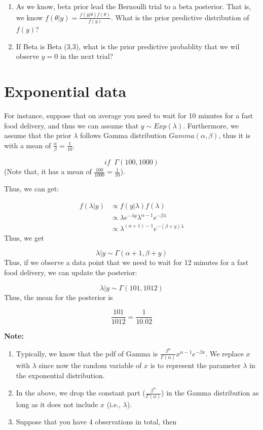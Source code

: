 \documentclass[
]{book}
\begin{document}
\begin{enumerate}
\def\labelenumi{(\arabic{enumi})}
\item
  As we know, beta prior lead the Bernoulli trial to a beta posterior. That is, we know \(f(\theta|y)=\frac{f(y|\theta) f(\theta)}{f(y)}\). What is the prior predictive distribution of \(f(y)\)?
\item
  If Beta is Beta (3,3), what is the prior predictive probablity that we wil observe \(y=0\) in the next trial?
\end{enumerate}

\hypertarget{exponential-data}{%
\section{Exponential data}\label{exponential-data}}

For instance, suppose that on average you need to wait for 10 minutes for a fast food delivery, and thus we can assume that \(y \sim Exp(\lambda)\). Furthermore, we assume that the prior \(\lambda\) follows Gamma distribution \(Gamma(\alpha, \beta)\), thus it is with a mean of \(\frac{\alpha}{\beta}=\frac{1}{10}\).

\[if \; \; \Gamma (100, 1000)\]
(Note that, it has a mean of \(\frac{100}{1000}=\frac{1}{10}\)).

Thus, we can get:

\[\begin{aligned} f(\lambda | y) &\propto f(y|\lambda) f(\lambda) \\ &\propto \lambda e^{-\lambda y} \lambda^{\alpha-1}e^{-\beta \lambda} \\ &\propto \lambda^{(\alpha+1)-1} e^{-(\beta+y)\lambda } \end{aligned}\]
Thus, we get

\[\lambda |y \sim \Gamma (\alpha+1,\beta+y)\]
Thus, if we observe a data point that we need to wait for 12 minutes for a fast food delivery, we can update the posterior:

\[\lambda |y \sim \Gamma (101,1012)\]
Thus, the mean for the posterior is

\[\frac{101}{1012}=\frac{1}{10.02}\]

\textbf{Note:}

\begin{enumerate}
\def\labelenumi{(\arabic{enumi})}
\item
  Typically, we know that the pdf of Gamma is \(\frac{\beta^{\alpha}}{\Gamma(\alpha)}x^{\alpha-1}e^{-\beta x}\). We replace \(x\) with \(\lambda\) since now the random variable of \(x\) is to represent the parameter \(\lambda\) in the exponential distribution.
\item
  In the above, we drop the constant part (\(\frac{\beta^{\alpha}}{\Gamma(\alpha)}\)) in the Gamma distribution as long as it does not include \(x\) (i.e., \(\lambda\)).
\item
  Suppose that you have 4 observations in total, then
\end{enumerate}
\end{document}
